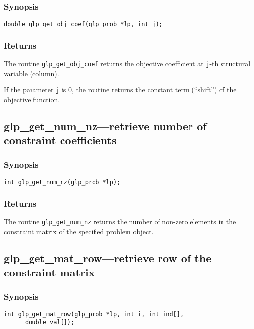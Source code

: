 \subsubsection*{Synopsis}

\begin{verbatim}
double glp_get_obj_coef(glp_prob *lp, int j);
\end{verbatim}

\subsubsection*{Returns}

The routine \verb|glp_get_obj_coef| returns the objective coefficient
at \verb|j|-th structural variable (column).

If the parameter \verb|j| is 0, the routine returns the constant term
(``shift'') of the objective function.

\subsection{glp\_get\_num\_nz---retrieve number of constraint
coefficients}

\subsubsection*{Synopsis}

\begin{verbatim}
int glp_get_num_nz(glp_prob *lp);
\end{verbatim}

\subsubsection*{Returns}

The routine \verb|glp_get_num_nz| returns the number of non-zero
elements in the constraint matrix of the specified problem object.

\subsection{glp\_get\_mat\_row---retrieve row of the constraint
matrix}

\subsubsection*{Synopsis}

\begin{verbatim}
int glp_get_mat_row(glp_prob *lp, int i, int ind[],
      double val[]);
\end{verbatim}

